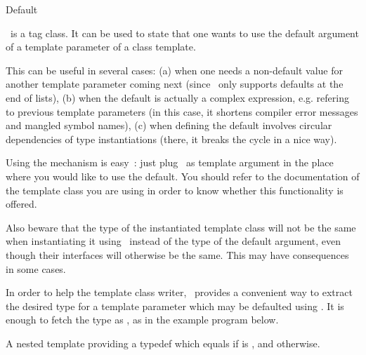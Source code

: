 \begin{ccRefClass}{Default}

\ccDefinition
\ccRefName\ is a tag class.  It can be used to state that one wants
to use the default argument of a template parameter of a class template.

This can be useful in several cases: (a) when one needs a non-default value for
another template parameter coming next (since \CC\ only supports defaults at
the end of lists), (b) when the default is actually a complex expression, e.g.
refering to previous template parameters (in this case, it shortens compiler
error messages and mangled symbol names), (c) when defining the default
involves circular dependencies of type instantiations (there, it breaks the
cycle in a nice way).

Using the mechanism is easy~: just plug \ccRefName\ as template argument
in the place where you would like to use the default.  You should refer
to the documentation of the template class you are using in order to know
whether this functionality is offered.

Also beware that the type of the instantiated template class will not be the
same when instantiating it using \ccRefName\ instead of the type of the default
argument, even though their interfaces will otherwise be the same.  This may
have consequences in some cases.

\ccIsModel
{}

\begin{ccAdvanced}

In order to help the template class writer, \ccRefName\ provides a convenient
way to extract the desired type for a template parameter which may be defaulted
using \ccRefName.  It is enough to fetch the type as
, as in the example program below.

\ccTypes

{A nested template providing a typedef  which equals  if
 is \ccRefName, and  otherwise.}

\end{ccAdvanced}



\end{ccRefClass} 
